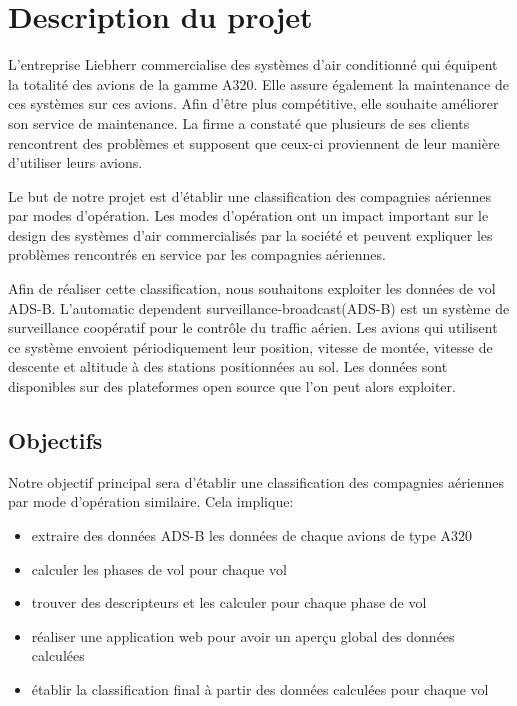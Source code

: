 \chapter*{Description du projet}
\label{chap:description}
L'entreprise Liebherr commercialise des systèmes d'air conditionné qui équipent
la totalité des avions de la gamme A320. Elle assure également la maintenance de ces systèmes sur ces avions. Afin d'être plus compétitive, elle souhaite améliorer son service de maintenance. La firme a constaté que plusieurs de ses clients rencontrent des problèmes et supposent que ceux-ci proviennent de leur manière d'utiliser leurs avions.

Le but de notre projet est d'établir une classification des compagnies aériennes par modes d'opération. Les modes d'opération ont un impact important sur le design des systèmes d'air commercialisés par la société et peuvent expliquer les problèmes rencontrés en service par les compagnies aériennes.

Afin de réaliser cette classification, nous souhaitons exploiter les données de vol ADS-B. L'automatic dependent surveillance-broadcast(ADS-B) est un système de surveillance coopératif pour le contrôle du traffic aérien. Les avions qui utilisent ce système envoient périodiquement leur position, vitesse de montée, vitesse de descente et altitude à des stations positionnées au sol. Les données sont disponibles sur des plateformes open source que l'on peut alors exploiter.

\section*{Objectifs}
Notre objectif principal sera d'établir une classification des compagnies aériennes par mode d'opération similaire. Cela implique:

\begin{itemize}
	\item extraire des données ADS-B les données de chaque avions de type A320
	\item calculer les phases de vol pour chaque vol
	\item trouver des descripteurs et les calculer pour chaque phase de vol
	\item réaliser une application web pour avoir un aperçu global des données calculées
	\item établir la classification final à partir des données calculées pour chaque vol
\end{itemize}

